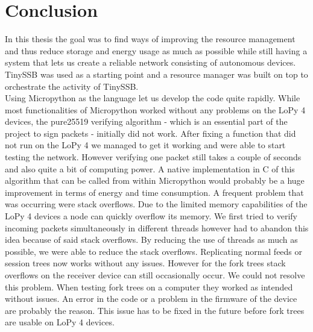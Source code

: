 \chapter{Conclusion}
In this thesis the goal was to find ways of improving the resource management and thus reduce storage and energy usage as much as possible while still having a system that lets us create a reliable network consisting of autonomous devices. TinySSB was used as a starting point and a resource manager was built on top to orchestrate the activity of TinySSB. \\
Using Micropython as the language let us develop the code quite rapidly. While most functionalities of Micropython worked without any problems on the LoPy 4 devices, the pure25519 verifying algorithm - which is an essential part of the project to sign packets - initially did not work. After fixing a function that did not run on the LoPy 4 we managed to get it working and were able to start testing the network. However verifying one packet still takes a couple of seconds and also quite a bit of computing power. A native implementation in C of this algorithm that can be called from within Micropython would probably be a huge improvement in terms of energy and time consumption. A frequent problem that was occurring were stack overflows. Due to the limited memory capabilities of the LoPy 4 devices a node can quickly overflow its memory. We first tried to verify incoming packets simultaneously in different threads however had to abandon this idea because of said stack overflows. By reducing the use of threads as much as possible, we were able to reduce the stack overflows. Replicating normal feeds or session trees now works without any issues. However for the fork trees stack overflows on the receiver device can still occasionally occur. We could not resolve this problem. When testing fork trees on a computer they worked as intended without issues. An error in the code or a problem in the firmware of the device are probably the reason. This issue has to be fixed in the future before fork trees are usable on LoPy 4 devices. \\
